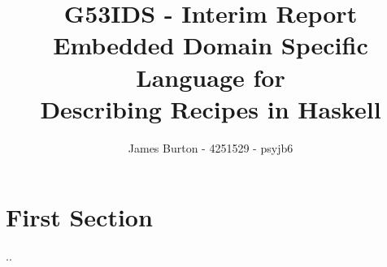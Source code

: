 \documentclass[12pt]{article}
\title
{ 
    G53IDS - Interim Report \\
    \hfill \break
    \large Embedded Domain Specific Language for \\
    Describing Recipes in Haskell
}
\author{James Burton - 4251529 - psyjb6}
\begin{document}
    \maketitle
    \newpage

    \section{First Section}

    ..
     
\end{document}
